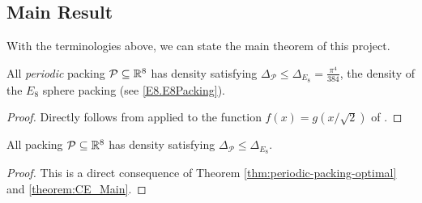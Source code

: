 \subsection{Main Result}

With the terminologies above, we can state the main theorem of this project.

\begin{theorem}\label{theorem:CE_Main}
  All \emph{periodic} packing $\mathcal{P} \subseteq \mathbb{R}^8$ has density satisfying $\Delta_{\mathcal{P}} \leq \Delta_{E_8} = \frac{\pi^4}{384}$, the density of the $E_8$ sphere packing (see \cref{E8.E8Packing}).
\end{theorem}
\begin{proof}
  Directly follows from  applied to the function $f(x)=g(x/\sqrt{2})$ of .
\end{proof}

\begin{corollary}\label{corollary:upper-bound-E8}
  All packing $\mathcal{P} \subseteq \mathbb{R}^8$ has density satisfying $\Delta_{\mathcal{P}} \leq \Delta_{E_8}$.
\end{corollary}
\begin{proof}
  This is a direct consequence of Theorem \cref{thm:periodic-packing-optimal} and \cref{theorem:CE_Main}.
\end{proof}

